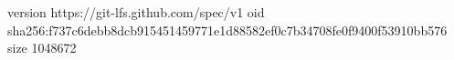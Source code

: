 version https://git-lfs.github.com/spec/v1
oid sha256:f737c6debb8dcb915451459771e1d88582ef0c7b34708fe0f9400f53910bb576
size 1048672
